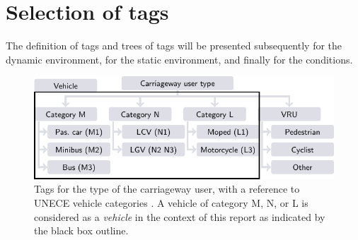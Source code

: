 \section{Selection of tags}
\label{sec:tags}

The definition of tags and trees of tags will be presented subsequently for the dynamic environment, for the static environment, and finally for the conditions.

\begin{figure}[t!]
	\centering
	\includegraphics{figures/actor_type}
	\caption{Tags for the type of the carriageway user, with a reference to UNECE vehicle categories \autocite{UNECE2011consolidated}. %
		A vehicle of category M, N, or L is considered as a \emph{vehicle} in the context of this report as indicated by the black box outline. 
	}
	\label{fig:tree carriageway user type}
\end{figure}

